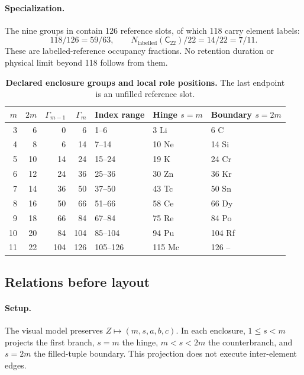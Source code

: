 \paragraph{Specialization.}
The nine groups in  contain 126 reference slots, of which 118 carry element labels:
\[
118/126=59/63,\qquad
N_{\mathrm{labelled}}(\mathsf C_{22})/22=14/22=7/11.
\]
These are labelled-reference occupancy fractions. No retention duration or physical limit beyond 118 follows from them.

\begin{table}[H]
\centering
\small
\setlength{\tabcolsep}{4pt}
\caption{\textbf{Declared enclosure groups and local role positions.} The last endpoint is an unfilled reference slot.}
\label{tab:matter1-enclosure-groups}
\begin{tabular}{@{}rrrrlll@{}}
\toprule
\(m\) & \(2m\) & \(\Gamma_{m-1}\) & \(\Gamma_m\) & Index range & Hinge \(s=m\) & Boundary \(s=2m\)\\
\midrule
3 & 6 & 0 & 6 & 1--6 & 3 Li & 6 C\\
4 & 8 & 6 & 14 & 7--14 & 10 Ne & 14 Si\\
5 & 10 & 14 & 24 & 15--24 & 19 K & 24 Cr\\
6 & 12 & 24 & 36 & 25--36 & 30 Zn & 36 Kr\\
7 & 14 & 36 & 50 & 37--50 & 43 Tc & 50 Sn\\
8 & 16 & 50 & 66 & 51--66 & 58 Ce & 66 Dy\\
9 & 18 & 66 & 84 & 67--84 & 75 Re & 84 Po\\
10 & 20 & 84 & 104 & 85--104 & 94 Pu & 104 Rf\\
11 & 22 & 104 & 126 & 105--126 & 115 Mc & 126 --\\
\bottomrule
\end{tabular}
\end{table}

\subsection{Relations before layout}\label{subsec:matter1-visual-model}
\paragraph{Setup.}
The visual model preserves \(Z\mapsto(m,s,a,b,c)\). In each enclosure, \(1\le s<m\) projects the first branch, \(s=m\) the hinge, \(m<s<2m\) the counterbranch, and \(s=2m\) the filled-tuple boundary. This projection does not execute inter-element edges.

